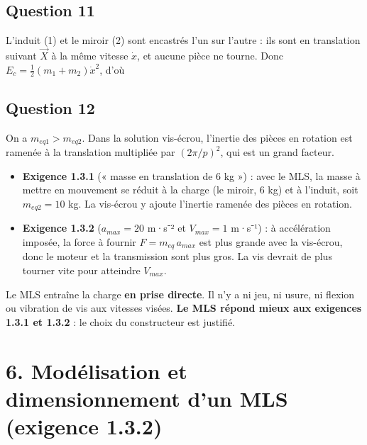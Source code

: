 \documentclass[11pt,a4paper]{article}
\providecommand{\tightlist}{\setlength{\itemsep}{0pt}\setlength{\parskip}{0pt}}
\newcommand{\equationajustee}[1]{%
  \sbox{\boiteequation}{$\displaystyle #1$}%
  \ifdim\wd\boiteequation>\linewidth
    \[\resizebox{\linewidth}{!}{\usebox{\boiteequation}}\]%
  \else
    \[#1\]%
  \fi}
\begin{document}
\hypertarget{question-11}{%
\subsection{Question 11}\label{question-11}}

L'induit (1) et le miroir (2) sont encastrés l'un sur l'autre : ils sont en translation suivant \(\vec X\) à la même vitesse \(\dot x\), et aucune pièce ne tourne. Donc \(E_c = \tfrac12(m_1+m_2)\dot x^2\), d'où

\equationajustee{\begin{aligned}
m_{eq2} &= m_1 + m_2\\
&= 4 + 6\\
&= 10\ \text{kg}
\end{aligned}}

\equationajustee{\boxed{m_{eq2} = 10\ \text{kg}}}

\hypertarget{question-12}{%
\subsection{Question 12}\label{question-12}}

On a \(m_{eq1} > m_{eq2}\). Dans la solution vis-écrou, l'inertie des pièces en rotation est ramenée à la translation multipliée par \((2\pi/p)^2\), qui est un grand facteur.

\begin{itemize}
\tightlist
\item
  \textbf{Exigence 1.3.1} (« masse en translation de 6 kg ») : avec le MLS, la masse à mettre en mouvement se réduit à la charge (le miroir, 6 kg) et à l'induit, soit \(m_{eq2} = 10\) kg. La vis-écrou y ajoute l'inertie ramenée des pièces en rotation.
\item
  \textbf{Exigence 1.3.2} (\(a_{max} = 20\) m·s⁻² et \(V_{max} = 1\) m·s⁻¹) : à accélération imposée, la force à fournir \(F = m_{eq}\,a_{max}\) est plus grande avec la vis-écrou, donc le moteur et la transmission sont plus gros. La vis devrait de plus tourner vite pour atteindre \(V_{max}\).
\end{itemize}

Le MLS entraîne la charge \textbf{en prise directe}. Il n'y a ni jeu, ni usure, ni flexion ou vibration de vis aux vitesses visées. \textbf{Le MLS répond mieux aux exigences 1.3.1 et 1.3.2} : le choix du constructeur est justifié.

\hypertarget{moduxe9lisation-et-dimensionnement-dun-mls-exigence-1.3.2}{%
\section{6. Modélisation et dimensionnement d'un MLS (exigence 1.3.2)}\label{moduxe9lisation-et-dimensionnement-dun-mls-exigence-1.3.2}}
\end{document}
